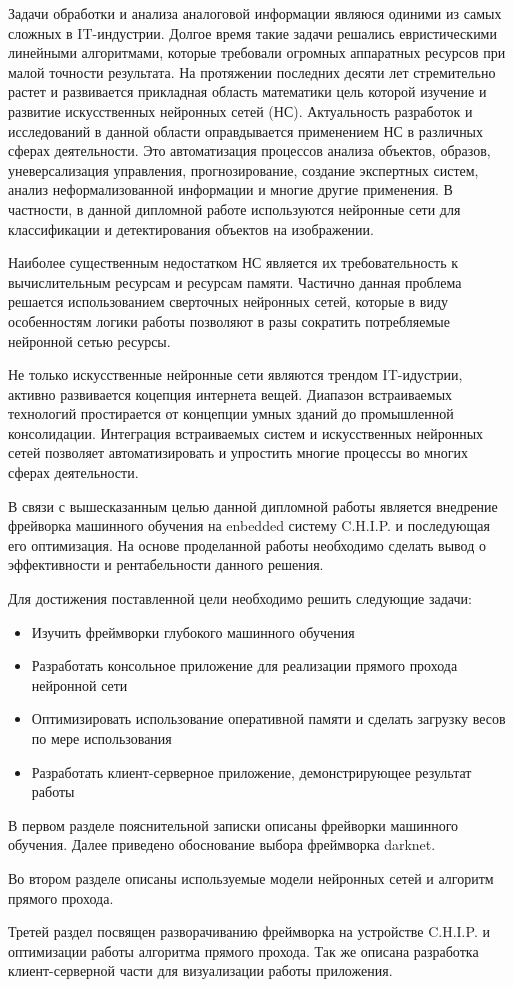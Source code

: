 \documentclass[a4paper,english,russian]{G2-105}
\begin{document}
\par Задачи обработки и анализа аналоговой информации являюся одиними из самых сложных в IT-индустрии. Долгое
время такие задачи решались евристическими линейными алгоритмами, которые требовали огромных аппаратных ресурсов при малой точности результата. На протяжении последних десяти лет стремительно растет и развивается прикладная область математики цель которой изучение и развитие искусственных нейронных сетей (НС). Актуальность разработок и исследований в данной области оправдывается применением НС в различных сферах деятельности. Это автоматизация процессов анализа объектов, образов, уневерсализация управления, прогнозирование, создание экспертных систем, анализ неформализованной информации и многие другие применения. В частности, в данной дипломной работе используются нейронные сети для классификации и детектирования объектов на изображении. 
\par Наиболее существенным недостатком НС является их требовательность к вычислительным ресурсам и ресурсам памяти. Частично данная проблема решается использованием сверточных нейронных сетей, которые в виду особенностям логики работы позволяют в разы сократить потребляемые нейронной сетью ресурсы.
\par Не только искусственные нейронные сети являются трендом IT-идустрии, активно развивается коцепция интернета вещей. Диапазон встраиваемых технологий простирается от концепции умных зданий до промышленной консолидации. Интеграция встраиваемых систем и искусственных нейронных сетей позволяет автоматизировать и упростить многие процессы во многих сферах деятельности.
\par В связи с вышесказанным целью данной дипломной работы является внедрение фрейворка машинного обучения на enbedded систему C.H.I.P. и последующая его оптимизация. На основе проделанной работы необходимо сделать вывод о эффективности и рентабельности данного решения. 
\par Для достижения поставленной цели необходимо решить следующие задачи:
\begin{itemize}
\item Изучить фреймворки глубокого машинного обучения
\item Разработать консольное приложение для реализации прямого прохода нейронной сети
\item Оптимизировать использование оперативной памяти и сделать загрузку весов по мере использования
\item Разработать клиент-серверное приложение, демонстрирующее результат работы
\end{itemize}
\par В первом разделе пояснительной записки описаны фрейворки машинного обучения. Далее приведено обоснование выбора фреймворка darknet.
\par Во втором разделе описаны используемые модели нейронных сетей и алгоритм прямого прохода.
\par Третей раздел посвящен разворачиванию фреймворка на устройстве C.H.I.P. и оптимизации работы алгоритма прямого прохода. Так же описана разработка клиент-серверной части для визуализации работы приложения. 
\newpage
\end{document}
